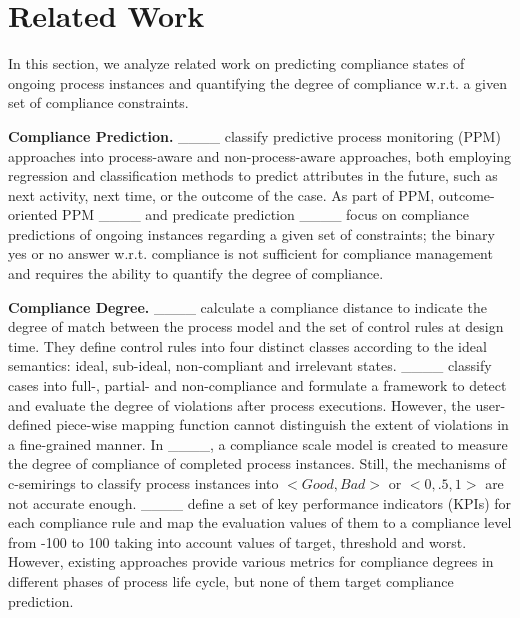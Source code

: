 \section{Related Work}
\label{sec:rel_work} 

In this section, we analyze related work on predicting compliance states of ongoing process instances and quantifying the degree of compliance w.r.t. a given set of compliance constraints.

\noindent\textbf{Compliance Prediction.} ____ classify predictive process monitoring (PPM) approaches into process-aware and non-process-aware approaches, both employing regression and classification methods to predict attributes in the future, such as next activity, next time, or the outcome of the case. As part of PPM, outcome-oriented PPM ____ and predicate prediction ____ focus on compliance predictions of ongoing instances regarding a given set of constraints; the binary yes or no answer w.r.t. compliance is not sufficient for compliance management and requires the ability to quantify the degree of compliance.

\noindent\textbf{Compliance Degree.} ____ calculate a compliance distance to indicate the degree of match between the process model and the set of control rules at design time. They define control rules into four distinct classes according to the ideal semantics: ideal, sub-ideal, non-compliant and irrelevant states.
____ classify cases into full-, partial- and non-compliance and formulate a framework to detect and evaluate the degree of violations after process executions. However, the user-defined piece-wise mapping function cannot distinguish the extent of violations in a fine-grained manner. In ____, a compliance scale model is created to measure the degree of compliance of completed process instances. Still, the mechanisms of c-semirings to classify process instances into $<Good, Bad>$ or $<0, .5, 1>$ are not accurate enough. ____ define a set of key performance indicators (KPIs) for each compliance rule and map the evaluation values of them to a compliance level from -100 to 100 taking into account values of target, threshold and worst. However, existing approaches provide various metrics for compliance degrees in different phases of process life cycle, but none of them target compliance prediction.
